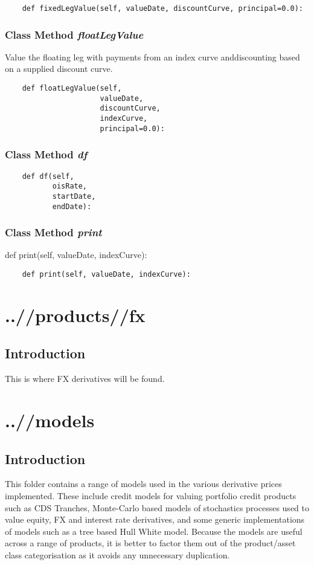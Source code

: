 \documentclass[twoside,11pt]{book}
\begin{document}
\begin{lstlisting}
    def fixedLegValue(self, valueDate, discountCurve, principal=0.0):
\end{lstlisting}

\subsection{Class Method {\it floatLegValue}}
Value the floating leg with payments from an index curve anddiscounting based on a supplied discount curve. 

\begin{lstlisting}
    def floatLegValue(self,
                      valueDate,
                      discountCurve,
                      indexCurve,
                      principal=0.0):
\end{lstlisting}

\subsection{Class Method {\it df}}


\begin{lstlisting}
    def df(self,
           oisRate,
           startDate,
           endDate):
\end{lstlisting}

\subsection{Class Method {\it print}}
def print(self, valueDate, indexCurve):

\begin{lstlisting}
    def print(self, valueDate, indexCurve):
\end{lstlisting}


\chapter{..//products//fx}
\section{Introduction}
This is where FX derivatives will be found.

\chapter{..//models}
\section{Introduction}
This folder contains a range of models used in the various derivative prices implemented. These include credit models for valuing portfolio credit products such as CDS Tranches, Monte-Carlo based models of stochastics processes used to value equity, FX and interest rate derivatives, and some generic implementations of models such as a tree based Hull White model. Because the models are useful across a range of products, it is better to factor them out of the product/asset class categorisation as it avoids any unnecessary duplication.
\end{document}
